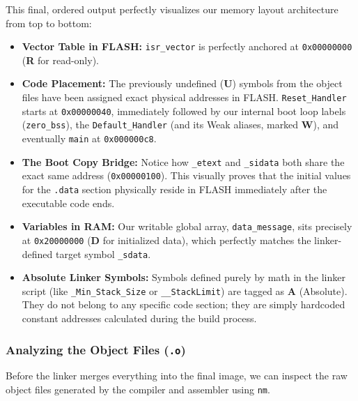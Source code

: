 This final, ordered output perfectly visualizes our memory layout architecture from top to bottom:
\begin{itemize}
    \item \textbf{Vector Table in FLASH:} \texttt{isr\_vector} is perfectly anchored at \texttt{0x00000000} (\textbf{R} for read-only).
    \item \textbf{Code Placement:} The previously undefined (\textbf{U}) symbols from the object files have been assigned exact physical addresses in FLASH. \texttt{Reset\_Handler} starts at \texttt{0x00000040}, immediately followed by our internal boot loop labels (\texttt{zero\_bss}), the \texttt{Default\_Handler} (and its Weak aliases, marked \textbf{W}), and eventually \texttt{main} at \texttt{0x000000c8}.
    \item \textbf{The Boot Copy Bridge:} Notice how \texttt{\_etext} and \texttt{\_sidata} both share the exact same address (\texttt{0x00000100}). This visually proves that the initial values for the \texttt{.data} section physically reside in FLASH immediately after the executable code ends.
    \item \textbf{Variables in RAM:} Our writable global array, \texttt{data\_message}, sits precisely at \texttt{0x20000000} (\textbf{D} for initialized data), which perfectly matches the linker-defined target symbol \texttt{\_sdata}.
    \item \textbf{Absolute Linker Symbols:} Symbols defined purely by math in the linker script (like \texttt{\_Min\_Stack\_Size} or \texttt{\_\_StackLimit}) are tagged as \textbf{A} (Absolute). They do not belong to any specific code section; they are simply hardcoded constant addresses calculated during the build process.
\end{itemize}
\vspace{1em}
\subsubsection{Analyzing the Object Files (\texttt{.o})}
Before the linker merges everything into the final image, we can inspect the raw object files generated by the compiler and assembler using \texttt{nm}. 

